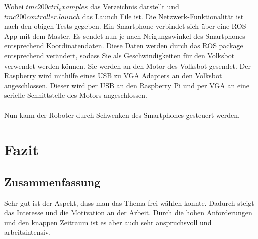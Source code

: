 \documentclass[12pt]{article}
\begin{document}
Wobei $tmc200ctrl_examples$ das Verzeichnis darstellt und \\ $tmc200controller.launch$ das Launch File ist.
Die Netzwerk-Funktionalität ist nach den obigen Tests gegeben.
Ein Smartphone verbindet sich über eine ROS App \cite{TeleopApp} mit dem Master.
Es sendet nun je nach Neigungswinkel des Smartphones entsprechend Koordinatendaten.
Diese Daten werden durch das ROS package entsprechend verändert, sodass Sie als Geschwindigkeiten für den Volksbot verwendet werden können.
Sie werden an den Motor des Volksbot gesendet.
Der Raspberry wird mithilfe eines USB zu VGA Adapters an den Volksbot angeschlossen. Dieser wird per USB an den Raspberry Pi und per VGA an eine serielle Schnittstelle des Motors angeschlossen. \\
\\
Nun kann der Roboter durch Schwenken des Smartphones gesteuert werden.














\section{Fazit}
\subsection{Zusammenfassung}

Sehr gut ist der Aspekt, dass man das Thema frei wählen konnte. Dadurch steigt das Interesse und die Motivation an der Arbeit. Durch die hohen Anforderungen und den knappen Zeitraum ist es aber auch sehr anspruchsvoll und arbeitsintensiv. 

\end{document}
